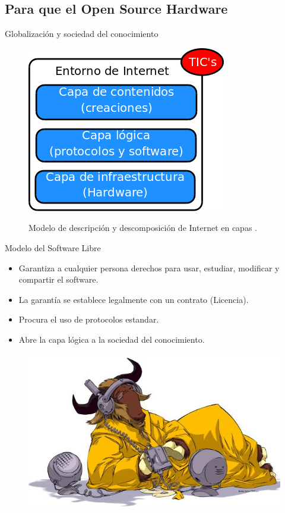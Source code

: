 \documentclass{beamer}
\begin{document}
\subsection{Para que el Open Source Hardware}

\begin{frame}{Globalización y sociedad del conocimiento}
  \begin{figure}
    \includegraphics[scale=0.3]{img/internet}
    \label{fig:internet}
    \caption{Modelo de descripción y descomposición de Internet en capas \cite{Bercelli}.}
  \end{figure}
\end{frame}

\begin{frame}{Modelo del Software Libre}
  \begin{itemize}
  \item Garantiza a cualquier persona derechos para usar, estudiar, modificar y compartir el software.
  \item La garantía se establece legalmente con un contrato (Licencia).
  \item Procura el uso de protocolos estandar.
  \item Abre la capa lógica a la sociedad del conocimiento.
  \end{itemize}
  \begin{figure}
    \includegraphics{img/listen-eighth}
  \end{figure}
\end{frame}
\end{document}
